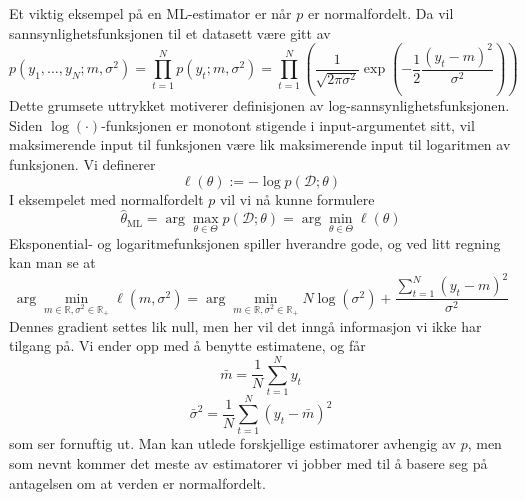 Et viktig eksempel på en ML-estimator er når $p$ er normalfordelt. Da vil sannsynlighetsfunksjonen til et datasett være gitt av
\begin{equation}
p\left(y_{1}, \ldots, y_{N} ; m, \sigma^{2}\right)=\prod_{t=1}^{N} p\left(y_{t} ; m, \sigma^{2}\right)=\prod_{t=1}^{N}\left(\frac{1}{\sqrt{2 \pi \sigma^{2}}} \exp \left(-\frac{1}{2} \frac{\left(y_{t}-m\right)^{2}}{\sigma^{2}}\right)\right)
\end{equation}
Dette grumsete uttrykket motiverer definisjonen av log-sannsynlighetsfunksjonen. Siden $\log(\cdot)$-funksjonen er monotont stigende i input-argumentet sitt, vil maksimerende input til funksjonen være lik maksimerende input til logaritmen av funksjonen. Vi definerer
\begin{equation}
\ell(\theta):=-\log p(\mathcal{D} ; \theta)
\end{equation}
I eksempelet med normalfordelt $p$ vil vi nå kunne formulere
\begin{equation}
\widehat{\theta}_{\mathrm{ML}}=\arg \max _{\theta \in \Theta} p(\mathcal{D} ; \theta) = \arg \min _{\theta \in \Theta} \ell(\theta)
\end{equation}
Eksponential- og logaritmefunksjonen spiller hverandre gode, og ved litt regning kan man se at
\begin{equation}
\arg \min _{m \in \mathbb{R}, \sigma^{2} \in \mathbb{R}_{+}} \ell\left(m, \sigma^{2}\right)=\arg \min _{m \in \mathbb{R}, \sigma^{2} \in \mathbb{R}_{+}} N \log \left(\sigma^{2}\right)+\frac{\sum_{t=1}^{N}\left(y_{t}-m\right)^{2}}{\sigma^{2}}
\end{equation}
Dennes gradient settes lik null, men her vil det inngå informasjon vi ikke har tilgang på. Vi ender opp med å benytte estimatene, og får
\begin{equation}
\bar{m}=\frac{1}{N} \sum_{t=1}^{N} y_{t}
\end{equation}
\begin{equation}
\bar{\sigma}^{2}=\frac{1}{N} \sum_{t=1}^{N}\left(y_{t}-\bar{m}\right)^{2}
\end{equation}
som ser fornuftig ut. Man kan utlede forskjellige estimatorer avhengig av $p$, men som nevnt kommer det meste av estimatorer vi jobber med til å basere seg på antagelsen om at verden er normalfordelt.
